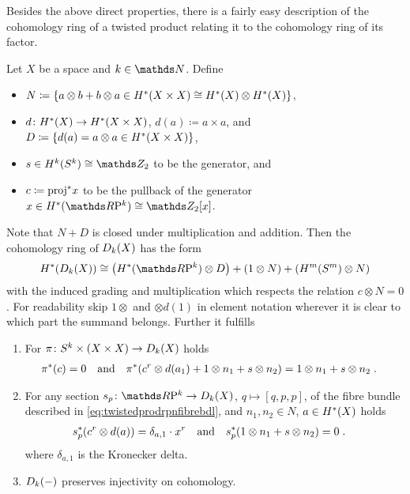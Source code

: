 Besides the above direct properties, there is a fairly easy
description of the cohomology ring of a twisted product relating it to
the cohomology ring of its factor.
\begin{Thm}\label{thm:twistedprod:cohomstructure}
  Let $X$ be a space and $k\in\Nat$.
  Define
  \begin{itemize}
  \item
    $N\coloneqq
    \left\{
        a\otimes b + b\otimes a
        \in H^*(X\times X)\cong H^*(X)\otimes H^*(X)
      \right\}$,
  \item
    $d\colon H^*(X)\to H^*(X\times X)$,
    $d(a)\coloneqq a\times a$, and
    $D\coloneqq
    \left\{ d(a)=a\otimes a \in H^*(X\times X) \right\}$,
  \item
    $s\in\H^k(\Sphere k)\cong\Zmod2$ to be the generator, and
  \item
    $c\coloneqq {\mathrm{proj}}^* x$ to be the pullback of the generator
    $x\in\H^*(\RP k)\cong\Zmod2[x]$.
  \end{itemize}
  Note that $N+D$ is closed under multiplication and addition.
  Then the cohomology ring of $D_{k}({X})$ has the form
  \begin{gather*}
    \H^*(\Twistedprod{k}{X})
    \cong
    \left(\H^*(\RP k)\otimes D\right)
    + \left( 1\otimes N \right)
    + \left( \H^m(\Sphere m) \otimes N \right)
  \end{gather*}
  with the induced grading and multiplication which respects the
  relation $c\otimes N=0$.
  For readability skip $1\otimes$ and $\otimes d(1)$ in element
  notation wherever it is clear to which part the summand belongs.
  Further it fulfills
  \begin{enumerate}
  \item
    For $\pi\colon S^{k}\times(X\times X)\to D_{k}({X})$
    holds
    \begin{align}\label{eq:twistedprodcohom:pi}
      {\pi}^*(c)&=0
      &\text{and}&
      &{\pi}^*(c^r\otimes d(a_1) + 1\otimes n_1 + s\otimes n_2)
      &= 1\otimes n_1 + s\otimes n_2
        \;.
    \end{align}
  \item
    For any section $s_p\colon\RP k\to\Twistedprod{k}{X}$, $q\mapsto[q,p,p]$,
    of the fibre bundle described in
    \eqref{eq:twistedprodrpnfibrebdl}, and $n_1,n_2\in N$, $a\in H^*(X)$ holds
    \begin{align}\label{eq:twistedprodcohom:section}
      {s}^*_p(c^r\otimes d(a)) &= \delta_{a,1} \cdot x^r
      &\text{and}&
      &{s}^*_p(1\otimes n_1 + s\otimes n_2) &= 0
      \;.
    \end{align}
    where $\delta_{a,1}$ is the Kronecker delta.
  \item\label{item:twistedprod:preservescohominj}
    $D_{k}({-})$ preserves injectivity on cohomology.
  \end{enumerate}
\end{Thm}

